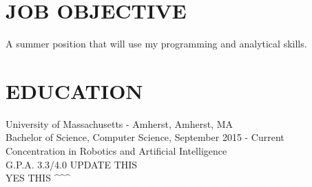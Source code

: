 \documentclass{res}
\begin{document}
 


\address{\bf  PRESENT ADDRESS\\145 Commonwealth Avenue\\Amherst, MA 01003-9253\\(908) 902-2202}
\address{\bf PERMANENT ADDRESS \\ 117 Agress Road \\  Millstone, NJ 08510 \\  (908) 902-2202}
                                  
\begin{resume}

\section{JOB OBJECTIVE}          
    A summer position that will use my programming and analytical skills.          
 
\section{EDUCATION}          
    University of Massachusetts - Amherst, Amherst, MA  \\        
    Bachelor of Science, Computer Science, September 2015 - Current   \\       
    Concentration in Robotics and Artificial Intelligence       \\
    G.P.A. 3.3/4.0          UPDATE THIS \\ 
    YES THIS \textasciicircum \textasciicircum \textasciicircum

 

\end{resume}
\end{document}
